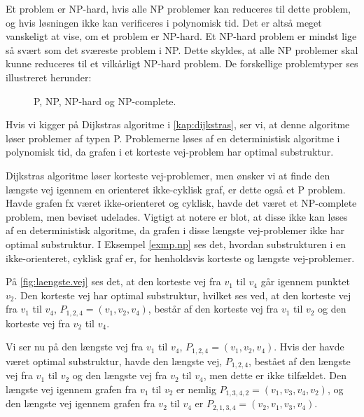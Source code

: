 Et problem er NP-hard, hvis alle NP problemer kan reduceres til dette problem, og hvis løsningen ikke kan verificeres i polynomisk tid. Det er altså meget vanskeligt at vise, om et problem er NP-hard. Et NP-hard problem er mindst lige så svært som det sværeste problem i NP. Dette skyldes, at alle NP problemer skal kunne reduceres til et vilkårligt NP-hard problem.
De forskellige problemtyper ses illustreret herunder:




\begin{figure}[H]
\centering
	\caption{P, NP, NP-hard og NP-complete.}
	\label{fig.dijkstraexmp}
\end{figure}

Hvis vi kigger på Dijkstras algoritme i \autoref{kap:dijkstras}, ser vi, at denne algoritme løser problemer af typen P. Problemerne løses af en deterministisk algoritme i polynomisk tid, da grafen i et korteste vej-problem har optimal substruktur.

Dijkstras algoritme løser korteste vej-problemer, men ønsker vi at finde den længste vej igennem en orienteret ikke-cyklisk graf, er dette også et P problem. Havde grafen fx været ikke-orienteret og cyklisk, havde det været et NP-complete problem, men beviset udelades. Vigtigt at notere er blot, at disse ikke kan løses af en deterministisk algoritme, da grafen i disse længste vej-problemer ikke har optimal substruktur.
I Eksempel \ref{exmp.np} ses det, hvordan substrukturen i en ikke-orienteret, cyklisk graf er, for henholdsvis korteste og længste vej-problemer.

\begin{exmp} \label{exmp.np}
På \autoref{fig:laengste.vej} ses det, at den korteste vej  fra $v_1$ til $v_4$ går igennem punktet $v_2$. Den korteste vej har optimal substruktur, hvilket ses ved, at den korteste vej fra $v_{1}$ til $v_{4}$, $P_{1,2,4}=(v_{1},v_{2},v_{4})$, består af den korteste vej fra $v_{1}$ til $v_{2}$ og den korteste vej fra $v_{2}$ til $v_{4}$. 

Vi ser nu på den længste vej fra $v_1$ til $v_4$, $P_{1,2,4}=(v_{1},v_{2},v_{4})$. Hvis der havde været optimal substruktur, havde den længste vej, $P_{1,2,4}$, bestået af den længste vej fra $v_{1}$ til $v_{2}$ og den længste vej fra $v_{2}$ til $v_{4}$, men dette er ikke tilfældet. Den længste vej igennem grafen fra $v_{1}$ til $v_{2}$ er nemlig $P_{1,3,4,2}=(v_{1},v_{3},v_{4},v_{2})$, og den længste vej igennem grafen fra $v_{2}$ til $v_{4}$ er $P_{2,1,3,4}=(v_{2},v_{1},v_{3},v_{4})$. 






\end{exmp}


